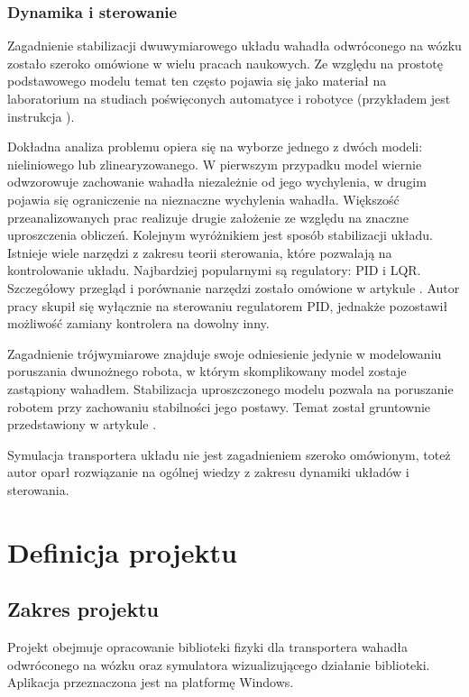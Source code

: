 \documentclass[12pt, oneside]{report}
\theoremstyle{definition}
\begin{document}
\subsection{Dynamika i sterowanie}
Zagadnienie stabilizacji dwuwymiarowego układu wahadła odwróconego na wózku zostało szeroko omówione w wielu pracach naukowych. Ze względu na prostotę podstawowego modelu temat ten często pojawia się jako materiał na laboratorium na studiach poświęconych automatyce i robotyce (przykładem jest instrukcja \cite{LIMP}).

Dokładna analiza problemu opiera się na wyborze jednego z dwóch modeli: nieliniowego lub zlinearyzowanego. W pierwszym przypadku model wiernie odwzorowuje zachowanie wahadła niezależnie od jego wychylenia, w drugim pojawia się ograniczenie na nieznaczne wychylenia wahadła. Większość przeanalizowanych prac realizuje drugie założenie ze względu na znaczne uproszczenia obliczeń. Kolejnym wyróżnikiem jest sposób stabilizacji układu. Istnieje wiele narzędzi z zakresu teorii sterowania, które pozwalają na kontrolowanie układu. Najbardziej popularnymi są regulatory: PID i LQR. Szczegółowy przegląd i porównanie narzędzi zostało omówione w artykule \cite{OptimalControl}. Autor pracy skupił się wyłącznie na sterowaniu regulatorem PID, jednakże pozostawił możliwość zamiany kontrolera na dowolny inny.

Zagadnienie trójwymiarowe znajduje swoje odniesienie jedynie w modelowaniu poruszania dwunożnego robota, w którym skomplikowany model zostaje zastąpiony wahadłem. Stabilizacja uproszczonego modelu pozwala na poruszanie robotem przy zachowaniu stabilności jego postawy. Temat został gruntownie przedstawiony w artykule \cite{BipedWalking}.

Symulacja transportera układu nie jest zagadnieniem szeroko omówionym, toteż autor oparł rozwiązanie na ogólnej wiedzy z zakresu dynamiki układów i sterowania. 


\newpage
\chapter{Definicja projektu}
\section{Zakres projektu}
Projekt obejmuje opracowanie biblioteki fizyki dla transportera wahadła odwróconego na wózku oraz symulatora wizualizującego działanie biblioteki. Aplikacja przeznaczona jest na platformę Windows.
\end{document}
